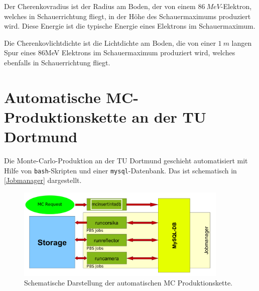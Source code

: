 Der Cherenkovradius ist der Radius am Boden, der von einem $\SI{86}{MeV}$-Elektron, welches in Schauerrichtung fliegt, in der Höhe des Schauermaximums produziert wird.
Diese Energie ist die typische Energie eines Elektrons im Schauermaximum.\cite{Superstar}

Die Cherenkovlichtdichte ist die Lichtdichte am Boden, die von einer $\SI{1}{m}$ langen Spur eines 86MeV Elektrons im Schauermaximum produziert wird, welches ebenfalls in Schauerrichtung fliegt.\cite{Superstar}






\section{Automatische MC-Produktionskette an der TU Dortmund}
\label{sec:Automatische MC-Produktion}

Die Monte-Carlo-Produktion an der TU Dortmund geschieht automatisiert mit Hilfe von \texttt{bash}-Skripten und einer \texttt{mysql}-Datenbank. 
Das ist schematisch in \autoref{Jobmanager} dargestellt.

\begin{figure}
    \centering
    \includegraphics[width=0.9\textwidth]{./Plots/03_MonteCarlos/Jobmanager.png}
    \caption{Schematische Darstellung der automatischen MC Produktionskette.}
    \label{Jobmanager}
\end{figure}


